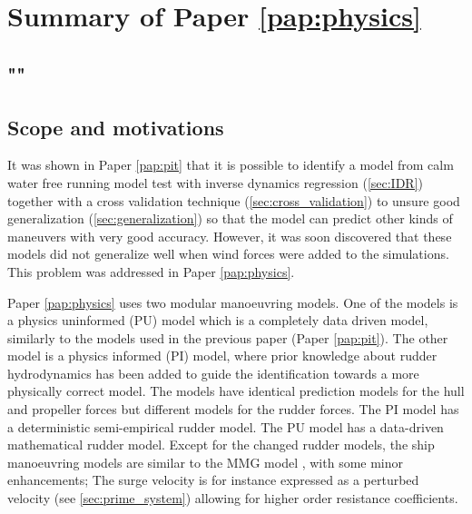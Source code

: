 \section{Summary of Paper \ref{pap:physics}}
\subsection*{""}
\subsection*{Scope and motivations}
It was shown in Paper \ref{pap:pit} that it is possible to identify a model from calm water free running model test with inverse dynamics regression (\autoref{sec:IDR}) together with a cross validation technique (\autoref{sec:cross_validation}) to unsure good generalization (\autoref{sec:generalization}) so that the model can predict other kinds of maneuvers with very good accuracy. However, it was soon discovered that these models did not generalize well when wind forces were added to the simulations. This problem was addressed in Paper \ref{pap:physics}.

Paper \ref{pap:physics} uses two modular manoeuvring models. One of the models is a physics uninformed (PU) model which is a completely data driven model, similarly to the models used in the previous paper (Paper \ref{pap:pit}).
The other model is a physics informed (PI) model, where prior knowledge about rudder hydrodynamics has been added to guide the identification towards a more physically correct model. 
The models have identical prediction models for the hull and propeller forces but different models for the rudder forces. The PI model has a deterministic semi-empirical rudder model. The PU model has a data-driven mathematical rudder model. Except for the changed rudder models, the ship manoeuvring models are similar to the MMG model \cite{yasukawa_introduction_2015}, with some minor enhancements; The surge velocity is for instance expressed as a perturbed velocity (see \autoref{sec:prime_system}) allowing for higher order resistance coefficients.


